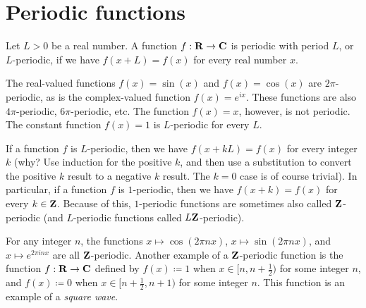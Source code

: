 \section{Periodic functions}\label{sec 5.1}

\begin{definition}\label{5.1.1}
  Let \(L > 0\) be a real number.
  A function \(f : \mathbf{R} \to \mathbf{C}\) is periodic with period \(L\), or \(L\)-periodic, if we have \(f(x + L) = f(x)\) for every real number \(x\).
\end{definition}

\begin{example}\label{5.1.2}
  The real-valued functions \(f(x) = \sin(x)\) and \(f(x) = \cos(x)\) are \(2\pi\)-periodic, as is the complex-valued function \(f(x) = e^{i x}\).
  These functions are also \(4\pi\)-periodic, \(6\pi\)-periodic, etc.
  The function \(f(x) = x\), however, is not periodic.
  The constant function \(f(x) = 1\) is \(L\)-periodic for every \(L\).
\end{example}

\begin{remark}\label{5.1.3}
  If a function \(f\) is \(L\)-periodic, then we have \(f(x + kL) = f(x)\) for every integer \(k\)
  (why? Use induction for the positive \(k\), and then use a substitution to convert the positive \(k\) result to a negative \(k\) result.
  The \(k = 0\) case is of course trivial).
  In particular, if a function \(f\) is \(1\)-periodic, then we have \(f(x + k) = f(x)\) for every \(k \in \mathbf{Z}\).
  Because of this, \(1\)-periodic functions are sometimes also called \(\mathbf{Z}\)-periodic
  (and \(L\)-periodic functions called \(L \mathbf{Z}\)-periodic).
\end{remark}

\begin{example}\label{5.1.4}
  For any integer \(n\), the functions \(x \mapsto \cos(2 \pi n x)\), \(x \mapsto \sin(2 \pi n x)\), and \(x \mapsto e^{2 \pi i n x}\) are all \(\mathbf{Z}\)-periodic.
  Another example of a \(\mathbf{Z}\)-periodic function is the function \(f : \mathbf{R} \to \mathbf{C}\) defined by \(f(x) \coloneqq 1\) when \(x \in [n, n + \frac{1}{2})\) for some integer \(n\), and \(f(x) \coloneqq 0\) when \(x \in [n + \frac{1}{2}, n + 1)\) for some integer \(n\).
  This function is an example of a \emph{square wave}.
\end{example}

